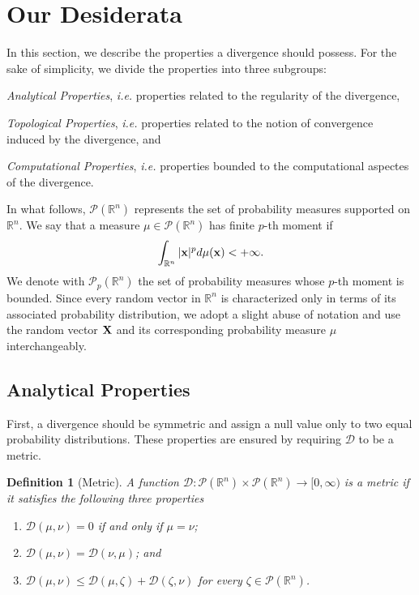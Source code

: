 \documentclass{article}
\renewcommand{\le}{\leqslant}
\renewcommand{\to}{\rightarrow}
\def\bx{{\bf x}}
\def\bX{{\bf X}}
\def \PP{\mathcal{P}}
\def \erre{\mathbb{R}}
\newtheorem{definition}{Definition}
\begin{document}
\section{Our Desiderata}
\label{sec:desired_properties}
% 
In this section, we describe the properties a divergence should possess.
% 
For the sake of simplicity, we divide the properties into three subgroups: \begin{enumerate*}[label=(\roman*)]
    \item \textit{Analytical Properties}, \textit{i.e.} properties related to the regularity of the divergence,
    \item \textit{Topological Properties}, \textit{i.e.} properties related to the notion of convergence induced by the divergence, and
    \item \textit{Computational Properties}, \textit{i.e.} properties bounded to the computational aspectes of the divergence.
\end{enumerate*}
% 

% 
In what follows, $\mathcal{P}(\mathbb{R}^n)$ represents the set of probability measures supported on $\mathbb{R}^n$.
% 
We say that a measure $\mu\in\PP(\erre^n)$ has finite $p$-th moment if 
\begin{equation}
    \int_{\erre^n}|\bx|^pd\mu(\bx)<+\infty.
\end{equation}
% 
We denote with $\PP_p(\erre^n)$ the set of probability measures whose $p$-th moment is bounded.
% 
Since every random vector in $\mathbb{R}^n$ is characterized only in terms of its associated probability distribution, we adopt a slight abuse of notation and use the random vector $\bX$ and its corresponding probability measure $\mu$ interchangeably.
% 

\subsection{Analytical Properties}

% 
First, a divergence should be symmetric and assign a null value only to two equal probability distributions.
% 
These properties are ensured by requiring $\mathcal{D}$ to be a metric.
% 

\begin{definition}[Metric]
    A function $\mathcal{D}:\PP(\erre^n)\times\PP(\erre^n)\to[0,\infty)$ is a metric if it satisfies the following three properties
    \begin{enumerate}[label=(\roman*)]
        \item \label{ax:dist1} $\mathcal{D}(\mu,\nu)=0$ if and only if $\mu=\nu$;
        \item \label{ax:dist2} $\mathcal{D}(\mu,\nu)=\mathcal{D}(\nu,\mu)$; and
        \item \label{ax:dist3} $\mathcal{D}(\mu,\nu)\le\mathcal{D}(\mu,\zeta)+\mathcal{D}(\zeta,\nu)$ for every $\zeta\in\PP(\erre^n)$.
    \end{enumerate}
\end{definition}
\end{document}
